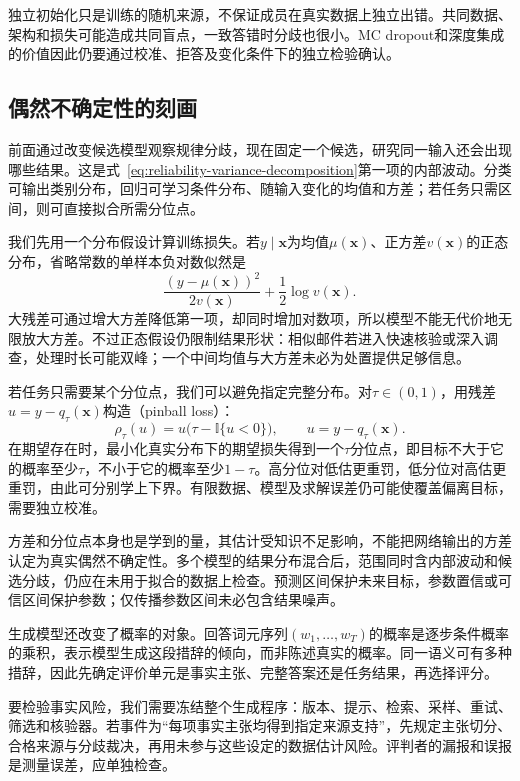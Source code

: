 独立初始化只是训练的随机来源，不保证成员在真实数据上独立出错。共同数据、架构和损失可能造成共同盲点，一致答错时分歧也很小。MC dropout和深度集成的价值因此仍要通过校准、拒答及变化条件下的独立检验确认。

\subsection{偶然不确定性的刻画}
\label{sec:reliability-aleatoric-estimation}

前面通过改变候选模型观察规律分歧，现在固定一个候选，研究同一输入还会出现哪些结果。这是式~\eqref{eq:reliability-variance-decomposition}第一项的内部波动。分类可输出类别分布，回归可学习条件分布、随输入变化的均值和方差；若任务只需区间，则可直接拟合所需分位点。

我们先用一个分布假设计算训练损失。若$y\mid\bm{x}$为均值$\mu(\bm{x})$、正方差$v(\bm{x})$的正态分布，省略常数的单样本负对数似然是
\[
 \frac{(y-\mu(\bm{x}))^2}{2v(\bm{x})}
       +\frac12\log v(\bm{x}).
\]
大残差可通过增大方差降低第一项，却同时增加对数项，所以模型不能无代价地无限放大方差。不过正态假设仍限制结果形状：相似邮件若进入快速核验或深入调查，处理时长可能双峰；一个中间均值与大方差未必为处置提供足够信息。

若任务只需要某个分位点，我们可以避免指定完整分布。对$\tau\in(0,1)$，用残差$u=y-q_\tau(\bm{x})$构造（pinball loss）：
\[
\rho_\tau(u)=u\bigl(\tau-\mathbb I\{u<0\}\bigr),
 \qquad u=y-q_\tau(\bm{x}).
\]
在期望存在时，最小化真实分布下的期望损失得到一个$\tau$分位点，即目标不大于它的概率至少$\tau$，不小于它的概率至少$1-\tau$。高分位对低估更重罚，低分位对高估更重罚，由此可分别学上下界。有限数据、模型及求解误差仍可能使覆盖偏离目标，需要独立校准。

方差和分位点本身也是学到的量，其估计受知识不足影响，不能把网络输出的方差认定为真实偶然不确定性。多个模型的结果分布混合后，范围同时含内部波动和候选分歧，仍应在未用于拟合的数据上检查。预测区间保护未来目标，参数置信或可信区间保护参数；仅传播参数区间未必包含结果噪声。

生成模型还改变了概率的对象。回答词元序列$(w_1,\ldots,w_T)$的概率是逐步条件概率的乘积，表示模型生成这段措辞的倾向，而非陈述真实的概率。同一语义可有多种措辞，因此先确定评价单元是事实主张、完整答案还是任务结果，再选择评分。

要检验事实风险，我们需要冻结整个生成程序：版本、提示、检索、采样、重试、筛选和核验器。若事件为“每项事实主张均得到指定来源支持”，先规定主张切分、合格来源与分歧裁决，再用未参与这些设定的数据估计风险。评判者的漏报和误报是测量误差，应单独检查。

